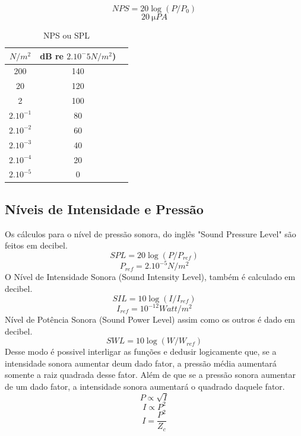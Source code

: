 \documentclass[
	article,			%
	11pt,				%
	oneside,			%
	a4paper,			%
	english,			%
	brazil,				%
	sumario=tradicional
	]{abntex2}
\begin{document}
$$NPS = 20 \log (P/P_0)$$
$$\SI{20}{\micro}PA$$

\begin{table}[hb]
\centering
    \begin{tabular}{c c c}
$N/m^2$ & dB re $2 . 10^-5 N/m^2$)\\ 
\hline
200 & 140\\

20 & 120\\

2 & 100\\

$2 . 10^{-1}$ & 80\\

$2 . 10^{-2}$ & 60\\

$2 . 10^{-3}$ & 40\\

$2 . 10^{-4}$ & 20\\

$2 . 10^{-5}$ & 0\\

    \end{tabular}
    \caption{NPS ou SPL}
\end{table}

\subsection{Níveis de Intensidade e Pressão}
Os cálculos para o nível de pressão sonora, do inglês "Sound Pressure Level" são feitos em decibel.
$$SPL = 20 \log (P/P_{ref})$$
$$P_{ref} = 2.10^{-5} N/m^2$$
O Nível de Intensidade Sonora (Sound Intensity Level), também é calculado em decibel.
$$SIL = 10 \log (I/I_{ref})$$
$$I_{ref} = 10^{-12} Watt/m^2$$
Nível de Potência Sonora (Sound Power Level) assim como os outros é dado em decibel.
$$SWL = 10 \log (W/W_{ref})$$
Desse modo é possivel interligar as funções e dedusir logicamente que, se a intensidade sonora aumentar deum dado fator, a pressão média aumentará somente a raiz quadrada desse fator. Além de que se a pressão sonora aumentar de um dado fator, a intensidade sonora aumentará o quadrado daquele fator.
$$P \propto \sqrt{I}$$
$$I \propto P^2$$
$$I = \frac{P^2}{Z_c}$$
\end{document}
